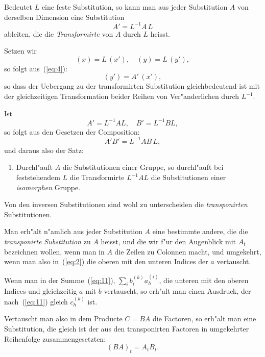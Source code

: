 \documentclass[12pt,a4paper]{article}
\theoremstyle{weber}
\begin{document}
Bedeutet $L$ eine feste Substitution, so kann man aus jeder Substitution $A$ von derselben Dimension eine Substitution
\begin{equation}\label{eq:21}
A' = L^{-1} A\, L
\end{equation}
ableiten, die die \textit{Transformirte} von $A$ durch $L$ heisst.

Setzen wir
\begin{equation}\label{eq:22}
(x) = L\,(x'),\quad (y) = L\,(y'),
\end{equation}
so folgt aus~(\ref{eq:4}):
\begin{equation}\label{eq:23}
(y') = A'\,(x'),
\end{equation}
so dass der Uebergang zu der transformirten Substitution gleichbedeutend ist mit der gleichzeitigen Transformation beider Reihen von Ver"anderlichen durch $L^{-1}$.

Ist
\[
A' = L^{-1}AL,\quad B' = L^{-1}BL,
\]
so folgt aus den Gesetzen der Composition:
\[
A'B' = L^{-1}AB\,L,
\]
und daraus also der Satz:

\begin{enumerate}[label=\arabic*., resume]
\item Durchl"auft $A$ die Substitutionen einer Gruppe, so durchl"auft bei feststehendem $L$ die Transformirte $L^{-1}AL$ die Substitutionen einer \textit{isomorphen} Gruppe.
\end{enumerate}

Von den inversen Substitutionen sind wohl zu unterscheiden die \textit{transponirten} Substitutionen.

Man erh"alt n"amlich aus jeder Substitution $A$ eine bestimmte andere, die die \textit{transponirte Substitution} zu $A$ heisst, und die wir f"ur den Augenblick mit $A_t$ bezeichnen wollen, wenn man in $A$ die Zeilen zu Colonnen macht, und umgekehrt, wenn man also in~(\ref{eq:2}) die oberen mit den unteren Indices der $a$ vertauscht.

Wenn man in der Summe~(\ref{eq:11}), $\displaystyle\sum_i b_i^{(k)} a_h^{(i)}$, die unteren mit den oberen Indices und gleichzeitig $a$ mit $b$ vertauscht, so erh"alt man einen Ausdruck, der nach~(\ref{eq:11}) gleich $c_h^{(k)}$ ist.


Vertauscht man also in dem Producte $C = BA$ die Factoren, so erh"alt man eine Substitution, die gleich ist der aus den transponirten Factoren in umgekehrter Reihenfolge zusammengesetzten:
\begin{equation}\label{eq:24}
(BA)_t = A_t B_t.
\end{equation}
\end{document}
